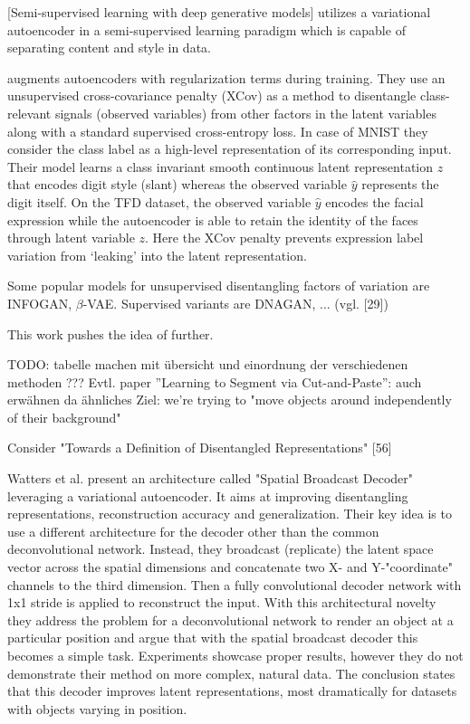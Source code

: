 \documentclass[12pt,a4paper]{article}
\begin{document}
[Semi-supervised learning with deep generative models] utilizes a variational autoencoder in a semi-supervised learning paradigm which is capable of separating content and style in data.

\par\cite{1412.6583} augments autoencoders with regularization terms during training. They use an unsupervised cross-covariance penalty (XCov) as a method to disentangle class-relevant signals (observed variables) from other factors in the latent variables along with a standard supervised cross-entropy loss. In case of MNIST they consider the class label as a high-level representation of its corresponding input. Their model learns a class invariant smooth continuous latent representation $z$ that encodes digit style (slant) whereas the observed variable $\hat{y}$ represents the digit itself. On the TFD dataset, the observed variable $\hat{y}$ encodes the facial expression while the autoencoder is able to retain the identity of the faces through latent variable $z$. Here the XCov penalty prevents expression label variation from ‘leaking’ into the latent representation.

\par Some popular models for unsupervised disentangling factors of variation are INFOGAN, $\beta$-VAE. Supervised variants are DNAGAN, ... (vgl. [29]) 

\par This work pushes the idea of \cite{1711.07410} further.

TODO: tabelle machen mit übersicht und einordnung der verschiedenen methoden ???
Evtl. paper ”Learning to Segment via Cut-and-Paste”: auch erwähnen da ähnliches Ziel: we're trying to "move objects around independently of their background"

Consider "Towards a Definition of Disentangled Representations" [56]

\par Watters et al. \cite{SpatialBDecoder} present an architecture called "Spatial Broadcast Decoder" leveraging a variational autoencoder. It aims at improving disentangling representations, reconstruction accuracy and generalization. Their key idea is to use a different architecture for the decoder other than the common deconvolutional network. Instead, they broadcast (replicate) the latent space vector across the spatial dimensions and concatenate two X- and Y-"coordinate" channels to the third dimension. Then a fully convolutional decoder network with 1x1 stride is applied to reconstruct the input. With this architectural novelty they address the problem for a deconvolutional network to render an object at a particular position and argue that with the spatial broadcast decoder this becomes a simple task. Experiments showcase proper results, however they do not demonstrate their method on more complex, natural data. The conclusion states that this decoder improves latent representations, most dramatically for datasets with objects varying in position.
\end{document}
